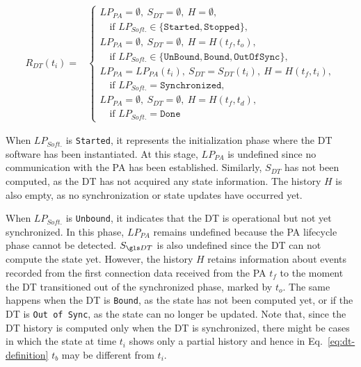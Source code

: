 \begin{equation}
\begin{split}
R_{DT}(t_i) = {} &
\begin{cases}
    LP_{PA} = \emptyset, \ S_{DT} = \emptyset, \ H = \emptyset,\\
    \quad \text{if } LP_{Soft.} \in \{\texttt{Started}, \texttt{Stopped}\}, \\[0.4em]
    LP_{PA} = \emptyset, \ S_{DT} = \emptyset, \ H = H(t_f, t_o),\\
    \quad \text{if } LP_{Soft.} \in \{\texttt{UnBound}, \texttt{Bound}, \texttt{OutOfSync}\}, \\[0.4em]
    LP_{PA} = LP_{PA}(t_i), \ S_{DT} = S_{DT}(t_i), \ H = H(t_f, t_i),\\
    \quad \text{if } LP_{Soft.} = \texttt{Synchronized},\\[0.4em]
    LP_{PA} = \emptyset, \ S_{DT} = \emptyset, \ H = H(t_f, t_d),\\
    \quad \text{if } LP_{Soft.} = \texttt{Done}
\end{cases}
\end{split}
\label{eq:lpdt_complete_mapping}
\end{equation}

When $LP_{Soft.}$ is \texttt{Started}, it represents the initialization phase where the \ac{DT} software has been instantiated. At this stage, $LP_{PA}$ is undefined since no communication with the \ac{PA} has been established. 
Similarly, $S_{DT}$ has not been computed, as the \ac{DT} has not acquired any state information. The history $H$ is also empty, as no synchronization or state updates have occurred yet.

When $LP_{Soft.}$ is \texttt{Unbound}, it indicates that the \ac{DT} is operational but not yet synchronized.
In this phase, $LP_{PA}$ remains undefined because the \ac{PA} lifecycle phase cannot be detected.
$S_{\ac{DT}}$ is also undefined since the \ac{DT} can not compute the state yet.
However, the history $H$ retains information about events recorded from the first connection data received from the \ac{PA} $t_{f}$ to the moment the \ac{DT} transitioned out of the synchronized phase, marked by $t_{o}$.
%
The same happens when the \ac{DT} is \texttt{Bound}, as the state has not been computed yet, 
or if the \ac{DT} is \texttt{Out of Sync}, as the state can no longer be updated.
%
Note that, since the \ac{DT} history is computed only when the \ac{DT} is synchronized, there might be cases in which the state at time $t_i$ shows only a partial history and hence in Eq.~\ref{eq:dt-definition} $t_b$ may be different from $t_i$.

